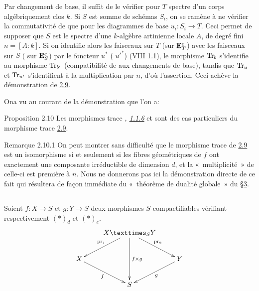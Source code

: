 \documentclass[10pt]{../fichiers-configuration-latex/smfart}
\begin{document}
Par changement de base, il suffit de le vérifier pour $T$ spectre d'un
corps algébriquement clos $k$. Si $S$ est somme de schémas $S_{i}$, on
se ramène à ne vérifier la commutativité de  que pour les
diagrammes  de base $u_{i}:S_{i}\rightarrow T$. Ceci permet de
supposer que $S$ est le spectre d'une $k$-algèbre artinienne locale
$A$, de degré fini $n=[A:k]$. Si on identifie alors les faisceaux sur
$T$ (\resp sur $\mathbf{E}^{e}_{T}$) avec les faisceaux sur $S$ (\resp
sur $\mathbf{E}^{e}_{S}$) par le foncteur $u^{\ast}$ (\resp
${u'}^{\ast}$) (VIII 1.1), le morphisme $\operatorname{Tr}_{b}$ s'identifie au
morphisme $\operatorname{Tr}_{b'}$ (compatibilité de  aux changements de
base), tandis que $\operatorname{Tr}_{u}$ et $\operatorname{Tr}_{u'}$ s'identifient à la
multiplication par $n$, d'où l'assertion. Ceci achève la démonstration
de \hyperref[XVIII.thm2.9]{2.9}.

On\pageoriginale a vu au courant de la démonstration que l'on a:

\begin{enonce*}{Proposition 2.10}
Les morphismes trace \emph{,
  \hyperref[XVIII.prop1.1.6]{1.1.6}} et  sont des cas
  particuliers du morphisme trace \hyperref[XVIII.thm2.9]{2.9}.
\end{enonce*}

\begin{enonce*}[remark]{Remarque 2.10.1}
On peut montrer sans difficulté que le morphisme trace de
\hyperref[XVIII.thm2.9]{2.9} est un 
isomorphisme si et seulement si les fibres géométriques de $f$ ont
exactement une composante irréductible de dimension $d$, et la « multiplicité »  de celle-ci est première à $n$. Nous ne donnerons
pas ici la démonstration directe de ce fait qui résultera de façon
immédiate du « théorème de dualité globale »  du \S \hyperref[XVIII.sec3]{3}.
\end{enonce*}

\setcounter{subsection}{10}
\subsection{}
Soient $f:X\rightarrow S$ et $g:Y\rightarrow S$ deux morphismes
$S$-compactifiables vérifiant respectivement $(\ast)_{d}$ et
$(\ast)_{e}$.
$$
\xymatrix{
     & \fprod{X}{Y}{S} \ar[dd]^{f\times g}\ar[ld]_{\pr_1}\ar[rd]^{\pr_2} & \\
X\ar[rd]_{f} &                                        & Y\ar[ld]^{g} \\ 
             &    S                                   &
}
$$
\end{document}
